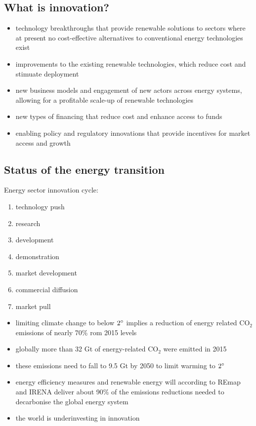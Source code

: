 \subsection{What is innovation?}
\begin{itemize}
	\item technology breakthroughs that provide renewable solutions to
	sectors where at present no cost-effective alternatives to
	conventional energy technologies exist
	\item improvements to the existing renewable technologies, which
	reduce cost and stimuate deployment
	\item new business models and engagement of new actors across
	energy systems, allowing for a profitable scale-up of renewable
	technologies
	\item new types of financing that reduce cost and enhance access to
	funds
	\item enabling policy and regulatory innovations that provide
	incentives for market access and growth
\end{itemize}

\subsection{Status of the energy transition}
Energy sector innovation cycle:
\begin{enumerate}
	\item technology push
	\item research
	\item development
	\item demonstration
	\item market development
	\item commercial diffusion
	\item market pull
\end{enumerate}

\begin{itemize}
	\item limiting climate change to below $2 \degree$ implies a reduction
	of energy related CO$_2$ emissions of nearly 70\% rom 2015 levels
	\item globally more than 32 Gt of energy-related CO$_2$ were emitted in
	2015
	\item these emissions need to fall to 9.5 Gt by 2050 to limit warming
	to $2 \degree$
	\item energy efficiency measures and renewable energy will according
	to REmap and IRENA deliver about 90\% of the emissions reductions
	needed to decarbonise the global energy system
	\item the world is underinvesting in innovation
\end{itemize}
